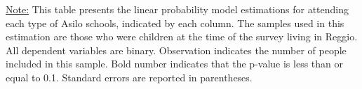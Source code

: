 \begin{scriptsize}
\noindent\underline{Note:} This table presents the linear probability model estimations for attending each type of Asilo schools, indicated by each column. The samples used in this estimation are those who were children at the time of the survey living in Reggio. All dependent variables are binary. Observation indicates the number of people included in this sample. Bold number indicates that the p-value is less than or equal to 0.1. Standard errors are reported in parentheses.
\end{scriptsize}

